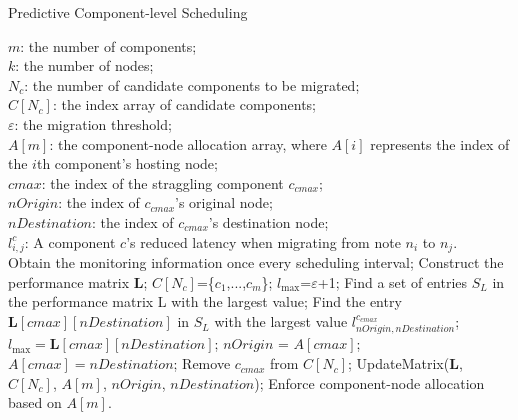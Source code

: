 \documentclass[10pt, conference, compsocconf]{IEEEtran}
\begin{document}
\begin{algorithm}[htbp]
\caption{Predictive Component-level Scheduling}
\label{SchedulingAlgorithm}
\begin{algorithmic}[1]
\REQUIRE $m$: the number of components;\\
$k$: the number of nodes;\\
$N_c$: the number of candidate components to be migrated;\\
$C[N_c]$: the index array of candidate components; \\
$\varepsilon$: the migration threshold; \\
$A[m]$: the component-node allocation array, where $A[i]$ represents the index of the $i$th component's hosting node; \\
$cmax$: the index of the straggling component $c_{cmax}$;\\
$nOrigin$: the index of $c_{cmax}$'s original node;\\
$nDestination$: the index of $c_{cmax}$'s destination node;\\
$l_{i,j}^c$: A component $c$'s reduced latency when migrating from note $n_i$ to $n_j$.\\

\STATE Obtain the monitoring information once every scheduling interval;
\STATE Construct the performance matrix $\textbf{L}$;
\STATE $C[N_c]$=\{$c_1$,...,$c_m$\};
\STATE $l_{\max}$=$\varepsilon$+1;
\STATE Find a set of entries $S_L$ in the performance matrix L with the largest value;
    \STATE Find the entry $\textbf{L}[cmax][nDestination]$ in $S_L$ with the largest value $l_{nOrigin,nDestination}^{c_{cmax}}$;
\STATE $l_{\max}=\textbf{L}[cmax][nDestination]$;
        \STATE $nOrigin$ = $A[cmax]$;
        \STATE $A[cmax]=nDestination$; \STATE Remove $c_{cmax}$ from $C[N_c]$;
        \STATE UpdateMatrix($\textbf{L}$, $C[N_c]$, $A[m]$, $nOrigin$, $nDestination$);
    \ENDIF
\ENDWHILE
\STATE Enforce component-node allocation based on $A[m]$.
\end{algorithmic}
\end{algorithm}
\end{document}
